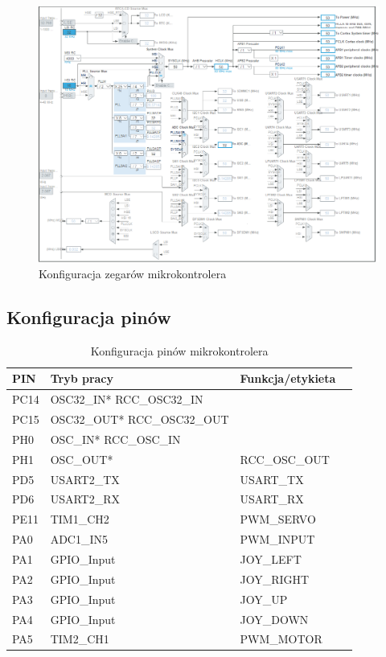 \documentclass[10pt, a4paper]{article}
\begin{document}
\newpage
\begin{figure}[H]
	\centering
	\includegraphics[width=0.9\textheight,angle=90]{figures/zegar.png}
	\caption{Konfiguracja zegarów mikrokontrolera}
	\label{fig:KonfiguracjaZegara}
\end{figure}

\subsection{Konfiguracja pinów}

\begin{table}[H]
	\centering
	\begin{tabular}{|l|l|l|l|}
		\hline
		PIN & Tryb pracy & Funkcja/etykieta\\
		\hline
		PC14 & OSC32\_IN*	RCC\_OSC32\_IN	&\\
		PC15 & OSC32\_OUT*	RCC\_OSC32\_OUT	&\\
		PH0&  OSC\_IN*	RCC\_OSC\_IN	&\\
		PH1&  OSC\_OUT*&		RCC\_OSC\_OUT	\\
		PD5&	USART2\_TX&	USART\_TX\\
		PD6&	USART2\_RX&	USART\_RX\\
		PE11&	TIM1\_CH2&	PWM\_SERVO\\
		PA0&	ADC1\_IN5&	PWM\_INPUT\\
		PA1&	GPIO\_Input&	JOY\_LEFT\\
		PA2&	GPIO\_Input&	JOY\_RIGHT\\
		PA3&	GPIO\_Input&	JOY\_UP\\
		PA4& GPIO\_Input& JOY\_DOWN\\
		PA5&	TIM2\_CH1&	PWM\_MOTOR\\
		
		
		\hline
	\end{tabular}
	\caption{Konfiguracja pinów mikrokontrolera}
\end{table}
\end{document}
